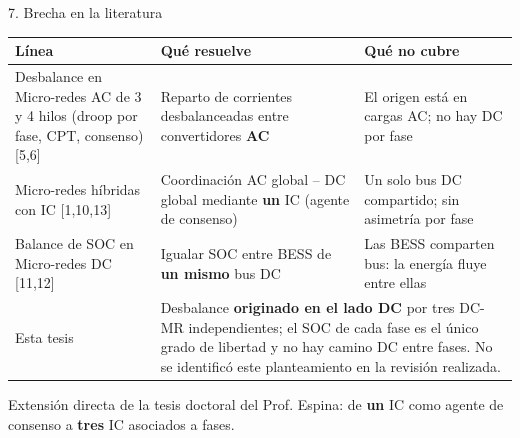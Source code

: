 \documentclass[aspectratio=169,11pt]{beamer}
\begin{document}
\begin{frame}{7. Brecha en la literatura}
  \footnotesize
  \begin{tabularx}{\textwidth}{@{}p{3.3cm}X p{3.4cm}@{}}
    \toprule
    Línea & Qué resuelve & Qué no cubre \\ \midrule
    Desbalance en Micro-redes AC de 3 y 4 hilos (droop por fase, CPT, consenso) [5,6] & Reparto de corrientes desbalanceadas entre convertidores \textbf{AC} & El origen está en cargas AC; no hay DC por fase \\
    Micro-redes híbridas con IC [1,10,13] & Coordinación AC global -- DC global mediante \textbf{un} IC (agente de consenso) & Un solo bus DC compartido; sin asimetría por fase \\
    Balance de SOC en Micro-redes DC [11,12] & Igualar SOC entre BESS de \textbf{un mismo} bus DC & Las BESS comparten bus: la energía fluye entre ellas \\ \midrule
    \alert{Esta tesis} & \multicolumn{2}{p{9.6cm}}{Desbalance \textbf{originado en el lado DC} por tres DC-MR independientes; el SOC de cada fase es el único grado de libertad y no hay camino DC entre fases. No se identificó este planteamiento en la revisión realizada.} \\ \bottomrule
  \end{tabularx}

  \vspace{6pt}
  \normalsize Extensión directa de la tesis doctoral del Prof. Espina: de \textbf{un} IC como agente de consenso a \textbf{tres} IC asociados a fases.
\end{frame}

\end{document}
